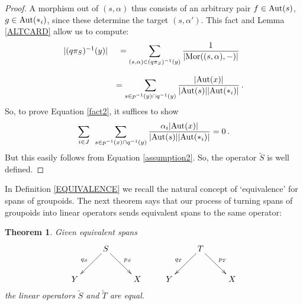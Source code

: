 \documentclass{article}
\newcommand{\Aut}{{\rm Aut}}
\newcommand{\Mor}{{\rm Mor}}
\newtheorem{thm}{Theorem}
\begin{document}
\begin{proof}
A morphism out of $(s,\alpha)$ thus consists of an arbitrary pair $f
\in \Aut(s)$, $g \in \Aut(\ast_i)$, since these determine the target
$(s,\alpha')$.  This fact and Lemma \ref{ALTCARD} allow us to compute:
\begin{equation}
\label{formula2}
\begin{array}{ccl}
\nonumber |(q\pi_S)^{-1}(y)| & = 
\displaystyle{ 
\sum_{(s,\alpha)\in (q\pi_S)^{-1}(y)}
\frac{1}{|\Mor((s,\alpha),-)|} 
}
\\
\\
& = 
\displaystyle{
\sum_{s \in p^{-1}(y) \cap q^{-1}(y)}
\frac{|\Aut(x)|}{|\Aut(s)||\Aut(\ast_i)|} \,.
} 
\end{array} 
\end{equation}
So, to prove Equation \ref{fact2}, it suffices to show
\begin{equation}
\label{fact3}
\sum_{i \in J} \;\, \sum_{s \in p^{-1}(x) \cap q^{-1}(y) }
\frac{\alpha_i|\Aut(x)|}{|\Aut(s)||\Aut(\ast_i)|} = 0 \,.
\end{equation}
But this easily follows from Equation \ref{assumption2}.  So, the
operator $\utilde{S}$ is well defined.
\end{proof}

In Definition \ref{EQUIVALENCE} we recall the natural concept of
`equivalence' for spans of groupoids.  The next theorem says that our
process of turning spans of groupoids into linear operators sends
equivalent spans to the same operator:

\begin{thm}\label{linops_equivspans1}
Given equivalent spans
\[
\xymatrix{
& S\ar[dl]_{q_S} \ar[dr]^{p_S} &  & & T\ar[dl]_{q_T} \ar[dr]^{p_T} &\\
Y & & X & Y & & X
}
\]
the linear operators $\utilde{S}$ and $\utilde{T}$ are equal.
\end{thm}
\end{document}
